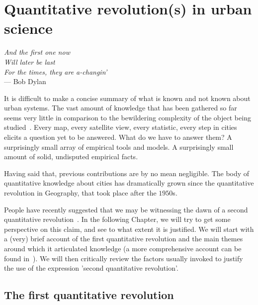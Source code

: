 

\chapter{Quantitative revolution(s) in urban science}
\label{chap:quantitative_revolutions}

\begin{flushright}{\slshape    
And the first one now\\
Will later be last\\
For the times, they are a-changin'} \\ \medskip
--- Bob Dylan 
\end{flushright}


\bigskip


It is difficult to make a concise summary of what is known and not known about
urban systems. The vast amount of knowledge that has been gathered so far seems
very little in comparison to the bewildering complexity of the object being
studied~\cite{Batty:2008}. Every map, every satellite view, every statistic, every step
in cities elicits a question yet to be answered. What do we have to answer them?
A surprisingly small array of empirical tools and models. A surprisingly small
amount of solid, undisputed empirical facts.

Having said that, previous contributions are by no mean negligible. The body of
quantitative knowledge about cities has dramatically grown since the
quantitative revolution in Geography, that took place after the $1950$s.

People have recently suggested that we may be witnessing the dawn of a second
quantitative revolution~\cite{Batty:2013}. In the following Chapter, we will try to get some perspective on this claim, and
see to what extent it is justified. We will start with a (very) brief account of the
first quantitative revolution and the main themes around which it articulated
knowledge (a more comprehensive account can be found in~\cite{Sanders:2011}). We
will then critically review the factors usually invoked to justify the
use of the expression 'second quantitative revolution'.



\section{The first quantitative revolution}
\label{sec:the_first_quantitative_revolution}

